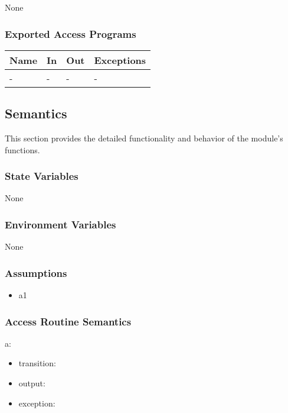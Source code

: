 \documentclass[12pt, titlepage]{article}
\begin{document}
None

\subsubsection{Exported Access Programs}

\begin{center}
\begin{tabular}{p{2cm} p{4cm} p{4cm} p{2cm}}
\hline
\textbf{Name} & \textbf{In} & \textbf{Out} & \textbf{Exceptions} \\
\hline
- & - & - & - \\
\hline
\end{tabular}
\end{center}

\subsection{Semantics}

This section provides the detailed functionality and behavior of the module’s
functions.

\subsubsection{State Variables}

None

\subsubsection{Environment Variables}

None

\subsubsection{Assumptions}

\begin{itemize}
\item a1
\end{itemize}

\subsubsection{Access Routine Semantics}

\noindent a:
\begin{itemize}
\item transition: 
\item output: 
\item exception: 
\end{itemize}
\end{document}
